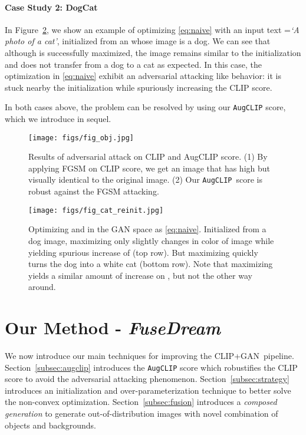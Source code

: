 \documentclass[10pt,twocolumn,letterpaper]{article}
\newcommand{\our}{\emph{FuseDream}}
\newcommand{\ganclip}{CLIP+GAN}
\newcommand{\ourloss}{\texttt{AugCLIP}}
\begin{document}
\paragraph{Case Study 2: DogCat}
In Figure~\ref{fig:augclip_score}, 
we show an example of optimizing \eqref{eq:naive} 
with an input text =\emph{`A photo of a cat'}, 
initialized from an 
whose image  is a dog. 
We can see that although    is successfully maximized, 
the image remains similar to the initialization and 
does not transfer from a dog to a cat as expected.  
In this case, the
optimization in \eqref{eq:naive} exhibit  an adversarial attacking like behavior: it is stuck nearby the initialization while spuriously increasing the CLIP score.  

In both cases above, the problem can be resolved by using our {\ourloss} score, which we introduce in sequel. 





\begin{figure}
    \centering
    \texttt{[image: figs/fig\_obj.jpg]}
    \caption{Results of adversarial attack on CLIP and AugCLIP score. (1) By applying FGSM on CLIP score, we get an image that has high  but visually identical to the original image. (2) Our \ourloss~score is robust against the FGSM attacking. 
}
    \label{fig:clip_score}
\end{figure}
\begin{figure}
    \centering
    \texttt{[image: figs/fig\_cat\_reinit.jpg]}
    \caption{Optimizing  and  in the GAN space as \eqref{eq:naive}.  
    Initialized from a dog image, maximizing  only slightly changes in color of image while yielding spurious increase of  (top row). But maximizing   quickly turns the dog into a white cat (bottom row). 
   Note that maximizing  yields a similar amount of increase on , but not the other way around. 
}
    \label{fig:augclip_score}
\end{figure}









\section{Our Method - \our}
We now introduce our main techniques 
for improving the \ganclip~pipeline. 
Section~\ref{subsec:augclip} 
introduces the {\ourloss} score which robustifies 
the CLIP score to avoid the adversarial attacking phenomenon. 
Section~\ref{subsec:strategy} 
introduces an initialization and over-parameterization technique 
to better solve the non-convex optimization. 
Section~\ref{subsec:fusion} 
introduces a \emph{composed generation} to generate out-of-distribution images 
with novel combination of objects and backgrounds. 
\end{document}
